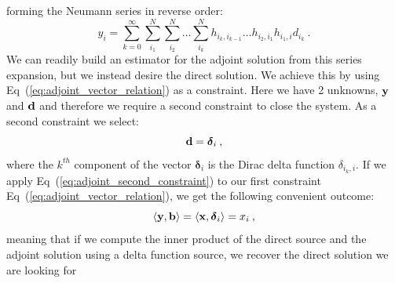 forming the Neumann series in reverse order:
\begin{equation}
  y_i = \sum_{k=0}^{\infty}\sum_{i_1}^{N}\sum_{i_2}^{N}\ldots
  \sum_{i_k}^{N}h_{i_k,i_{k-1}}\ldots h_{i_2,i_1} h_{i_1,i} d_{i_k}\:.
  \label{eq:adjoint_neumann_solution}
\end{equation}
We can readily build an estimator for the adjoint solution from this
series expansion, but we instead desire the direct solution. We
achieve this by using Eq~(\ref{eq:adjoint_vector_relation}) as a
constraint. Here we have 2 unknowns, $\mathbf{y}$ and $\mathbf{d}$ and
therefore we require a second constraint to close the system. As a
second constraint we select:
\begin{equation}
  \mathbf{d} = \boldsymbol{\delta}_i\:,
  \label{eq:adjoint_second_constraint}
\end{equation}
where the $k^{th}$ component of the vector $\boldsymbol{\delta}_i$ is
the Dirac delta function $\delta_{i_k,i}$. If we apply
Eq~(\ref{eq:adjoint_second_constraint}) to our first constraint
Eq~(\ref{eq:adjoint_vector_relation}), we get the following convenient
outcome:
\begin{equation}
  \langle \mathbf{y}, \mathbf{b} \rangle = \langle \mathbf{x},
  \boldsymbol{\delta}_i \rangle = x_i \:,
  \label{eq:inner_product_constraint}
\end{equation}
meaning that if we compute the inner product of the direct source and
the adjoint solution using a delta function source, we recover the
direct solution we are looking for 

